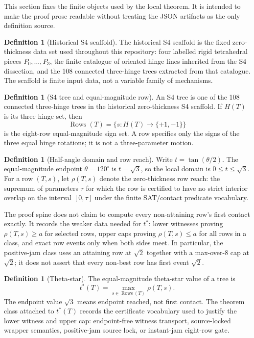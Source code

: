\documentclass[11pt,a4paper]{article}
\theoremstyle{definition}
\newtheorem{definition}[theorem]{Definition}
\theoremstyle{remark}
\begin{document}
This section fixes the finite objects used by the local theorem.  It is intended to make the proof prose readable without treating the JSON artifacts as the only definition source.

\begin{definition}[Historical S4 scaffold]
The historical S4 scaffold is the fixed zero-thickness data set used throughout this repository: four labelled rigid tetrahedral pieces \(P_0,\ldots,P_3\), the finite catalogue of oriented hinge lines inherited from the S4 dissection, and the 108 connected three-hinge trees extracted from that catalogue.  The scaffold is finite input data, not a variable family of mechanisms.
\end{definition}

\begin{definition}[S4 tree and equal-magnitude row]
An S4 tree is one of the 108 connected three-hinge trees in the historical zero-thickness S4 scaffold.  If \(H(T)\) is its three-hinge set, then
\[
  \operatorname{Rows}(T)=\{s:H(T)\to\{+1,-1\}\}
\]
is the eight-row equal-magnitude sign set.  A row specifies only the signs of the three equal hinge rotations; it is not a three-parameter motion.
\end{definition}

\begin{definition}[Half-angle domain and row reach]
Write \(t=\tan(\theta/2)\).  The equal-magnitude endpoint \(\theta=120^\circ\) is \(t=\sqrt{3}\), so the local domain is \(0\le t\le\sqrt{3}\).  For a row \((T,s)\), let \(\rho(T,s)\) denote the zero-thickness row reach: the supremum of parameters \(\tau\) for which the row is certified to have no strict interior overlap on the interval \([0,\tau]\) under the finite SAT/contact predicate vocabulary.

The proof spine does not claim to compute every non-attaining row's first contact exactly.  It records the weaker data needed for \(t^*\): lower witnesses proving \(\rho(T,s)\ge a\) for selected rows, upper caps proving \(\rho(T,s)\le a\) for all rows in a class, and exact row events only when both sides meet.  In particular, the positive-jam class uses an attaining row at \(\sqrt{2}\) together with a max-over-8 cap at \(\sqrt{2}\); it does not assert that every non-best row has first event \(\sqrt{2}\).
\end{definition}

\begin{definition}[Theta-star]
The equal-magnitude theta-star value of a tree is
\[
  t^*(T)=\max_{s\in\operatorname{Rows}(T)} \rho(T,s).
\]
The endpoint value \(\sqrt{3}\) means endpoint reached, not first contact.  The theorem class attached to \(t^*(T)\) records the certificate vocabulary used to justify the lower witness and upper cap: endpoint-free witness transport, source-locked wrapper semantics, positive-jam source lock, or instant-jam eight-row gate.
\end{definition}
\end{document}
